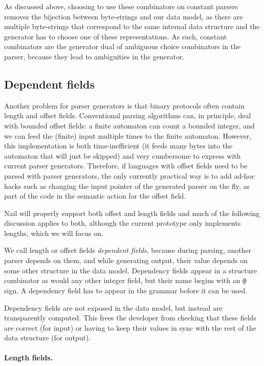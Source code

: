 As discussed above, choosing to use these combinators on constant parsers
removes the bijection between byte-strings and our data model, as there are
multiple byte-strings that correspond to the same internal data structure and
the generator has to choose one of these representations. As such, constant
combinators are the generator dual of ambiguous choice combinators in the
parser, because they lead to ambiguities in the generator.


\subsection{Dependent fields}
Another problem for parser generators is that binary protocols often contain
length and offset fields. Conventional parsing algorithms can, in principle,
deal with
bounded offset fields: a finite automaton can count a bounded integer, and we
can feed the (finite) input multiple times to the finite automaton. However,
this implementation is both time-inefficient (it feeds many bytes into the
automaton that will just be skipped) and very cumbersome to express with
current parser generators. Therefore, if languages with offset fields need
to be parsed
with parser generators, the only currently practical way is to add ad-hoc hacks
such as changing the input pointer of the generated parser on the fly, as part
of the code in the semantic action for the offset field.

Nail will properly support both offset and length fields and much of the
following discussion applies to both, although the current prototype only
implements lengths, which we will focus on.

We call length or offset fields \textit{dependent fields}, because during
parsing, another parser depends on them, and while generating output, their
value depends on some other structure in the data model. Dependency fields
appear in a structure combinator as would any other integer field, but
their name begins with an \texttt{@} sign.  A dependency field has to
appear in the grammar before it can be used.

Dependency fields are not exposed in the data model, but instead are
transparently computed.  This frees the developer from checking that
these fields are correct (for input) or having to keep their values in
sync with the rest of the data structure (for output).

\paragraph{Length fields.}

